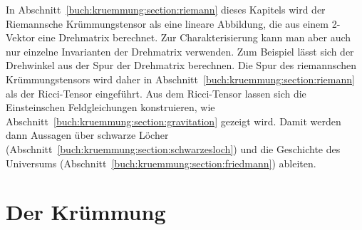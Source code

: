 In Abschnitt~\ref{buch:kruemmung:section:riemann} dieses Kapitels
wird der Riemannsche Krümmungstensor als eine lineare Abbildung,
die aus einem 2-Vektor eine Drehmatrix berechnet.
Zur Charakterisierung kann man aber auch nur einzelne Invarianten
der Drehmatrix verwenden.
Zum Beispiel lässt sich der Drehwinkel aus der Spur der Drehmatrix
berechnen.
Die Spur des riemannschen Krümmungstensors wird daher in 
Abschnitt~\ref{buch:kruemmung:section:riemann} als der Ricci-Tensor
eingeführt.
Aus dem Ricci-Tensor lassen sich die Einsteinschen Feldgleichungen
konstruieren, wie Abschnitt~\ref{buch:kruemmung:section:gravitation}
gezeigt wird.
Damit werden dann Aussagen über schwarze Löcher
(Abschnitt~\ref{buch:kruemmung:section:schwarzesloch})
und die Geschichte des Universums
(Abschnitt~\ref{buch:kruemmung:section:friedmann})
ableiten.

%
%
\section{Der Krümmung
\label{buch:kruemmung:section:riemann}}

